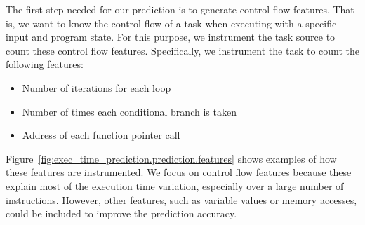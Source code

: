 The first step needed for our prediction is to generate control flow features.
That is, we want to know the control flow of a task when executing with a
specific input and program state.  For this purpose, we instrument the task
source to count these control flow features.  Specifically, we instrument the
task to count the following features:
\begin{itemize}
  \item Number of iterations for each loop
  \item Number of times each conditional branch is taken
  \item Address of each function pointer call
\end{itemize}
Figure~\ref{fig:exec_time_prediction.prediction.features} shows examples of how
these features are instrumented.  We focus on control flow features because
these explain most of the execution time variation, especially over a large
number of instructions. However, other features,
such as variable values or memory accesses, could be included to improve the
prediction accuracy.

